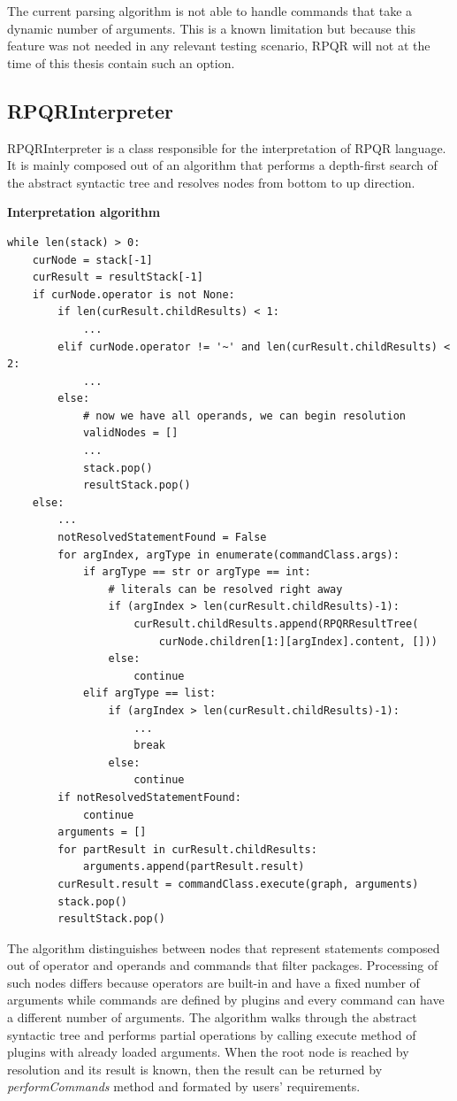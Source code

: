 The current parsing algorithm is not able to handle commands that take a dynamic number of arguments. This
is a known limitation but because this feature was not needed in any relevant testing scenario,
RPQR will not at the time of this thesis contain such an option.

\newpage

\subsection*{RPQRInterpreter}

RPQRInterpreter is a class responsible for the interpretation of RPQR language. It is mainly composed out
of an algorithm that performs a depth-first search of the abstract syntactic tree and resolves nodes from
bottom to up direction.

\textbf{Interpretation algorithm}

\begin{lstlisting}
while len(stack) > 0:
    curNode = stack[-1]
    curResult = resultStack[-1]
    if curNode.operator is not None:
        if len(curResult.childResults) < 1:
            ...
        elif curNode.operator != '~' and len(curResult.childResults) < 2:
            ...
        else:
            # now we have all operands, we can begin resolution
            validNodes = []
            ...
            stack.pop()
            resultStack.pop()
    else:
        ...
        notResolvedStatementFound = False
        for argIndex, argType in enumerate(commandClass.args):
            if argType == str or argType == int:
                # literals can be resolved right away
                if (argIndex > len(curResult.childResults)-1):
                    curResult.childResults.append(RPQRResultTree(
                        curNode.children[1:][argIndex].content, []))
                else:
                    continue
            elif argType == list:
                if (argIndex > len(curResult.childResults)-1):
                    ...
                    break
                else:
                    continue
        if notResolvedStatementFound:
            continue
        arguments = []
        for partResult in curResult.childResults:
            arguments.append(partResult.result)
        curResult.result = commandClass.execute(graph, arguments)
        stack.pop()
        resultStack.pop()
\end{lstlisting}

The algorithm distinguishes between nodes that represent statements composed out of operator and operands
and commands that filter packages. Processing of such nodes differs because operators are built-in
and have a fixed number of arguments while commands are defined by plugins and every command can have
a different number of arguments. The algorithm walks through the abstract syntactic tree and performs partial
operations by calling execute method of plugins with already loaded arguments. When the root node
is reached by resolution and its result is known, then the result can be returned by \textit{performCommands}
method and formated by users' requirements.

